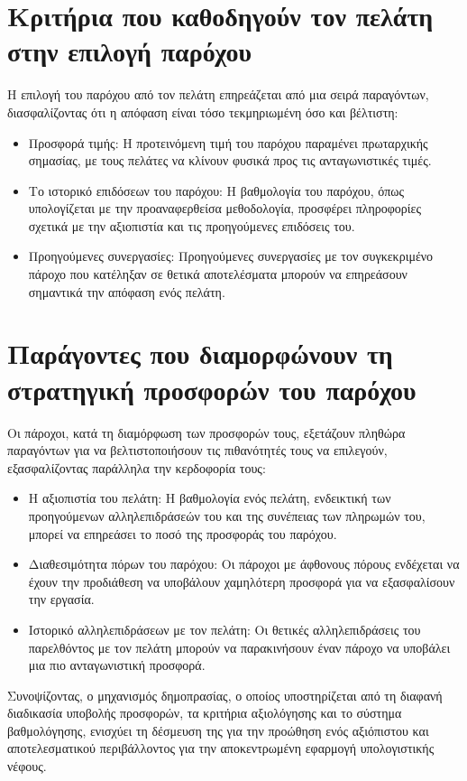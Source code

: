 \section{Κριτήρια που καθοδηγούν τον πελάτη στην επιλογή παρόχου}
Η επιλογή του παρόχου από τον πελάτη επηρεάζεται από μια σειρά παραγόντων, διασφαλίζοντας ότι η απόφαση είναι τόσο τεκμηριωμένη όσο και βέλτιστη:
\begin{itemize}
    \item Προσφορά τιμής: Η προτεινόμενη τιμή του παρόχου παραμένει πρωταρχικής σημασίας, με τους πελάτες να κλίνουν φυσικά προς τις ανταγωνιστικές τιμές.
    \item Το ιστορικό επιδόσεων του παρόχου: Η βαθμολογία του παρόχου, όπως υπολογίζεται με την προαναφερθείσα μεθοδολογία, προσφέρει πληροφορίες σχετικά με την αξιοπιστία και τις προηγούμενες επιδόσεις του.
    \item Προηγούμενες συνεργασίες: Προηγούμενες συνεργασίες με τον συγκεκριμένο πάροχο που κατέληξαν σε θετικά αποτελέσματα μπορούν να επηρεάσουν σημαντικά την απόφαση ενός πελάτη.
\end{itemize}

\section{Παράγοντες που διαμορφώνουν τη στρατηγική προσφορών του παρόχου}
Οι πάροχοι, κατά τη διαμόρφωση των προσφορών τους, εξετάζουν πληθώρα παραγόντων για να βελτιστοποιήσουν τις πιθανότητές τους να επιλεγούν, εξασφαλίζοντας παράλληλα την κερδοφορία τους:
\begin{itemize}
    \item Η αξιοπιστία του πελάτη: Η βαθμολογία ενός πελάτη, ενδεικτική των προηγούμενων αλληλεπιδράσεών του και της συνέπειας των πληρωμών του, μπορεί να επηρεάσει το ποσό της προσφοράς του παρόχου.
    \item Διαθεσιμότητα πόρων του παρόχου: Οι πάροχοι με άφθονους πόρους ενδέχεται να έχουν την προδιάθεση να υποβάλουν χαμηλότερη προσφορά για να εξασφαλίσουν την εργασία.
    \item Ιστορικό αλληλεπιδράσεων με τον πελάτη: Οι θετικές αλληλεπιδράσεις του παρελθόντος με τον πελάτη μπορούν να παρακινήσουν έναν πάροχο να υποβάλει μια πιο ανταγωνιστική προσφορά.
\end{itemize}

Συνοψίζοντας, ο μηχανισμός δημοπρασίας, ο οποίος υποστηρίζεται από τη διαφανή διαδικασία υποβολής προσφορών, τα κριτήρια αξιολόγησης και το σύστημα βαθμολόγησης, ενισχύει τη δέσμευση της  για την προώθηση ενός αξιόπιστου και αποτελεσματικού περιβάλλοντος για την αποκεντρωμένη εφαρμογή υπολογιστικής νέφους.
